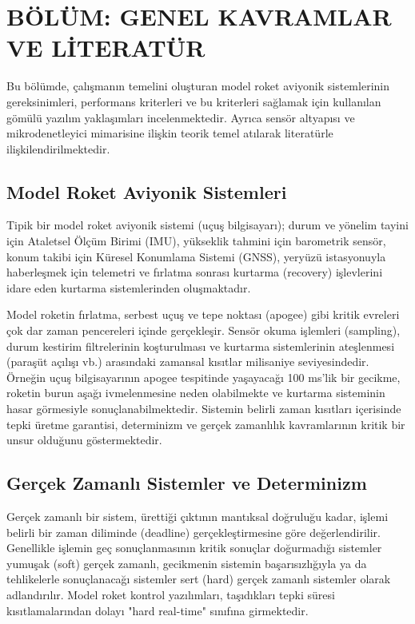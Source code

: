 \section{BÖLÜM: GENEL KAVRAMLAR VE LİTERATÜR}
\label{bolum2}

Bu bölümde, çalışmanın temelini oluşturan model roket aviyonik sistemlerinin gereksinimleri, performans kriterleri ve bu kriterleri sağlamak için kullanılan gömülü yazılım yaklaşımları incelenmektedir. Ayrıca sensör altyapısı ve mikrodenetleyici mimarisine ilişkin teorik temel atılarak literatürle ilişkilendirilmektedir.

\subsection{Model Roket Aviyonik Sistemleri}
\label{model_roket_aviyonik_sistemleri}
Tipik bir model roket aviyonik sistemi (uçuş bilgisayarı); durum ve yönelim tayini için Ataletsel Ölçüm Birimi (IMU), yükseklik tahmini için barometrik sensör, konum takibi için Küresel Konumlama Sistemi (GNSS), yeryüzü istasyonuyla haberleşmek için telemetri ve fırlatma sonrası kurtarma (recovery) işlevlerini idare eden kurtarma sistemlerinden oluşmaktadır. 

Model roketin fırlatma, serbest uçuş ve tepe noktası (apogee) gibi kritik evreleri çok dar zaman pencereleri içinde gerçekleşir. Sensör okuma işlemleri (sampling), durum kestirim filtrelerinin koşturulması ve kurtarma sistemlerinin ateşlenmesi (paraşüt açılışı vb.) arasındaki zamansal kısıtlar milisaniye seviyesindedir. Örneğin uçuş bilgisayarının apogee tespitinde yaşayacağı 100 ms'lik bir gecikme, roketin burun aşağı ivmelenmesine neden olabilmekte ve kurtarma sisteminin hasar görmesiyle sonuçlanabilmektedir. Sistemin belirli zaman kısıtları içerisinde tepki üretme garantisi, determinizm ve gerçek zamanlılık kavramlarının kritik bir unsur olduğunu göstermektedir.

\subsection{Gerçek Zamanlı Sistemler ve Determinizm}
\label{gercek_zamanli_sistemler}
Gerçek zamanlı bir sistem, ürettiği çıktının mantıksal doğruluğu kadar, işlemi belirli bir zaman diliminde (deadline) gerçekleştirmesine göre değerlendirilir. Genellikle işlemin geç sonuçlanmasının kritik sonuçlar doğurmadığı sistemler yumuşak (soft) gerçek zamanlı, gecikmenin sistemin başarısızlığıyla ya da tehlikelerle sonuçlanacağı sistemler sert (hard) gerçek zamanlı sistemler olarak adlandırılır. Model roket kontrol yazılımları, taşıdıkları tepki süresi kısıtlamalarından dolayı "hard real-time" sınıfına girmektedir.

